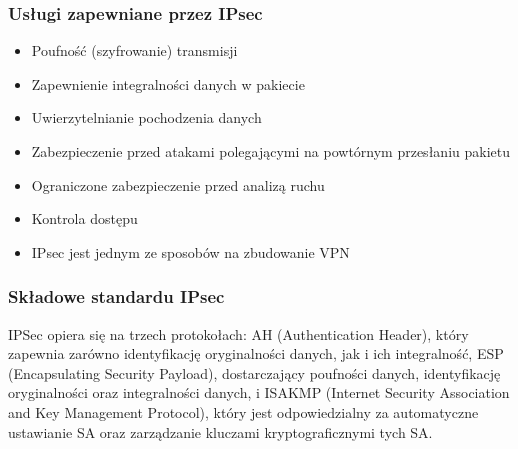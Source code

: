 \documentclass[main.tex]{subfiles}
\begin{document}
    \subsubsection{Usługi zapewniane przez IPsec}
    \begin{itemize}
        \item Poufność (szyfrowanie) transmisji
        \item Zapewnienie integralności danych w pakiecie
        \item Uwierzytelnianie pochodzenia danych
        \item Zabezpieczenie przed atakami polegającymi na powtórnym przesłaniu pakietu
        \item Ograniczone zabezpieczenie przed analizą ruchu
        \item Kontrola dostępu
        \item IPsec jest jednym ze sposobów na zbudowanie VPN
    \end{itemize}

    \subsubsection{Składowe standardu IPsec}
    IPSec opiera się na trzech protokołach: AH (Authentication Header), który zapewnia zarówno identyfikację oryginalności danych, jak i ich integralność, ESP (Encapsulating Security Payload), dostarczający poufności danych, identyfikację oryginalności oraz integralności danych, i ISAKMP (Internet Security Association and Key Management Protocol), który jest odpowiedzialny za automatyczne ustawianie SA oraz zarządzanie kluczami kryptograficznymi tych SA.
\end{document}
